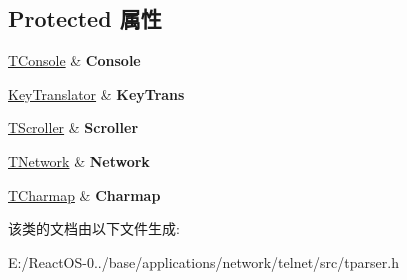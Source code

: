 \subsection*{Protected 属性}
\begin{DoxyCompactItemize}
\item 
\mbox{\label{class_t_parser_a8d989e3c1657b59f23f0702d6d69c456}} 
\hyperlink{class_t_console}{T\+Console} \& {\bfseries Console}
\item 
\mbox{\label{class_t_parser_a42e76dc23bfa06c5084eaf11ec2def3c}} 
\hyperlink{class_key_translator}{Key\+Translator} \& {\bfseries Key\+Trans}
\item 
\mbox{\label{class_t_parser_a93422c08e750e2665a00be0673e34274}} 
\hyperlink{class_t_scroller}{T\+Scroller} \& {\bfseries Scroller}
\item 
\mbox{\label{class_t_parser_aff749cba6d2d965a4df90251baa4ca66}} 
\hyperlink{class_t_network}{T\+Network} \& {\bfseries Network}
\item 
\mbox{\label{class_t_parser_aae2c9c8228becdb8ada374084a03c5d0}} 
\hyperlink{class_t_charmap}{T\+Charmap} \& {\bfseries Charmap}
\end{DoxyCompactItemize}


该类的文档由以下文件生成\+:\begin{DoxyCompactItemize}
\item 
E\+:/\+React\+O\+S-\/0../base/applications/network/telnet/src/tparser.\+h\end{DoxyCompactItemize}
